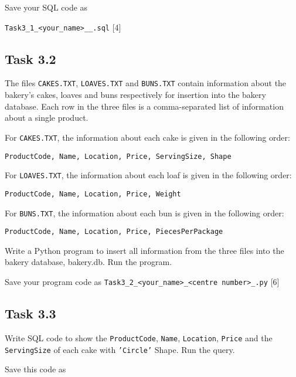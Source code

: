 Save your SQL code as 

\texttt{Task3\_1\_<your\_name>\_<centre number>\_<index number>.sql}
\hfill{}{[}4{]}

\subsection*{Task 3.2 }

The files \texttt{CAKES.TXT}, \texttt{LOAVES.TXT} and \texttt{BUNS.TXT}
contain information about the bakery\textquoteright s cakes, loaves
and buns respectively for insertion into the bakery database. Each
row in the three files is a comma-separated list of information about
a single product. 

For \texttt{CAKES.TXT}, the information about each cake is given in
the following order: 
\noindent \begin{center}
\texttt{ProductCode, Name, Location, Price, ServingSize, Shape }
\par\end{center}

For \texttt{LOAVES.TXT}, the information about each loaf is given
in the following order: 
\noindent \begin{center}
\texttt{ProductCode, Name, Location, Price, Weight }
\par\end{center}

For \texttt{BUNS.TXT}, the information about each bun is given in
the following order:
\noindent \begin{center}
\texttt{ProductCode, Name, Location, Price, PiecesPerPackage}
\par\end{center}

Write a Python program to insert all information from the three files
into the bakery database, bakery.db. Run the program. 

Save your program code as \texttt{Task3\_2\_<your\_name>\_<centre
number>\_<index number>.py} \hfill{}{[}6{]}

\subsection*{Task 3.3 }

Write SQL code to show the \texttt{ProductCode}, \texttt{Name}, \texttt{Location},
\texttt{Price} and the \texttt{ServingSize} of each cake with \texttt{'Circle'}
Shape. Run the query. 

Save this code as 

